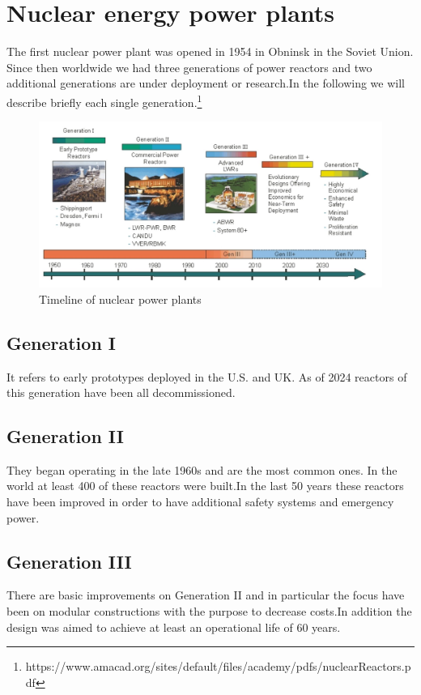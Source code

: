 \documentclass{article}
\begin{document}
\section{Nuclear energy power plants}
The first nuclear power plant was opened in 1954 in Obninsk in the Soviet Union. Since then worldwide we had three generations of power reactors and two additional generations are under deployment or research.In the following we will describe briefly each single generation.\footnote{https://www.amacad.org/sites/default/files/academy/pdfs/nuclearReactors.pdf}
\begin{figure}
    \centering
    \includegraphics[width=1\linewidth]{Generations.jpeg}
    \caption{Timeline of nuclear power plants\protect\footnotemark}
    \label{fig:enter-label}
\end{figure}

\subsection{Generation I}
It refers to early prototypes deployed in the U.S. and UK. As of 2024 reactors of this generation have been all decommissioned.

\subsection{Generation II}
They began operating in the late 1960s and are the most common ones. In the world at least 400 of these reactors were built.In the last 50 years these reactors have been improved in order to have additional safety systems and emergency power.

\subsection{Generation III}
There are basic improvements on Generation II and in particular the focus have been on modular constructions with the purpose to decrease costs.In addition the design was aimed to achieve at least an operational life of 60 years.
\end{document}
